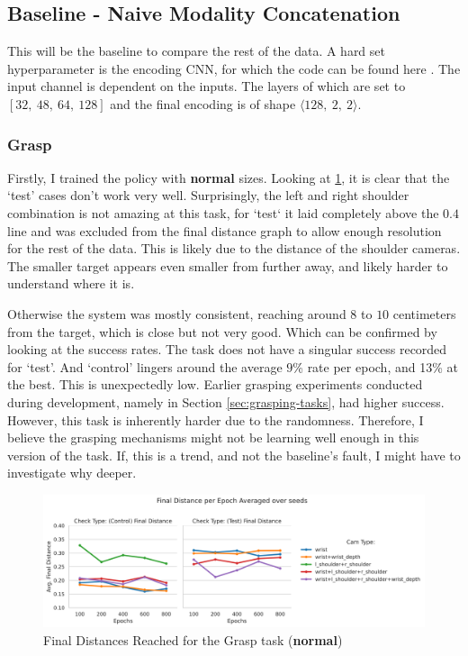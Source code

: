 \subsection{Baseline - Naive Modality Concatenation}
This will be the baseline to compare the rest of the data. A hard set hyperparameter is the encoding CNN, for which the code can be found here . The input channel is dependent on the inputs. The layers of which are set to $\left[32, ~48, ~64, ~128\right]$ and the final encoding is of shape \(\langle 128, ~2, ~2 \rangle\).

\subsubsection{Grasp}
Firstly, I trained the policy with \textbf{normal} sizes. Looking at \ref{fig:base-grasp-final-normal}, it is clear that the `test' cases don't work very well. Surprisingly, the left and right shoulder combination is not amazing at this task, for `test` it laid completely above the $0.4$ line and was excluded from the final distance graph to allow enough resolution for the rest of the data. This is likely due to the distance of the shoulder cameras. The smaller target appears even smaller from further away, and likely harder to understand where it is. 

Otherwise the system was mostly consistent, reaching around $8$ to $10$ centimeters from the target, which is close but not very good. Which can be confirmed by looking at the success rates. The task does not have a singular success recorded for `test'. And `control' lingers around the average $9$\% rate per epoch, and 13\% at the best. This is unexpectedly low. Earlier grasping experiments conducted during development, namely in Section \ref{sec:grasping-tasks}, had higher success. However, this task is inherently harder due to the randomness. Therefore, I believe the grasping mechanisms might not be learning well enough in this version of the task. If, this is a trend, and not the baseline's fault, I might have to investigate why deeper.

\begin{figure}[H]
  \centering
  \includegraphics[width=\linewidth]{assets/evaluation/baseline/base-grasp-final.png}
  \caption{Final Distances Reached for the Grasp task (\textbf{normal})}\label{fig:base-grasp-final-normal}
\end{figure}

